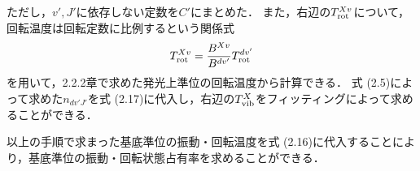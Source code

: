 ただし，$v', J'$に依存しない定数を$C'$にまとめた．
また，右辺の$T^{Xv}_{\rm rot}$について，回転温度は回転定数に比例するという関係式\cite{rot-temperature-ratio}
\begin{equation}
    T^{Xv}_{\rm rot} = \frac{B^{Xv}}{B^{dv'}} T^{dv'}_{\rm rot}
\end{equation}
を用いて，2.2.2章で求めた発光上準位の回転温度から計算できる．
式 (2.5)によって求めた$n_{dv'J'}$を式 (2.17)に代入し，右辺の$T^{X}_{\rm vib}$をフィッティングによって求めることができる．

以上の手順で求まった基底準位の振動・回転温度を式 (2.16)に代入することにより，基底準位の振動・回転状態占有率を求めることができる．